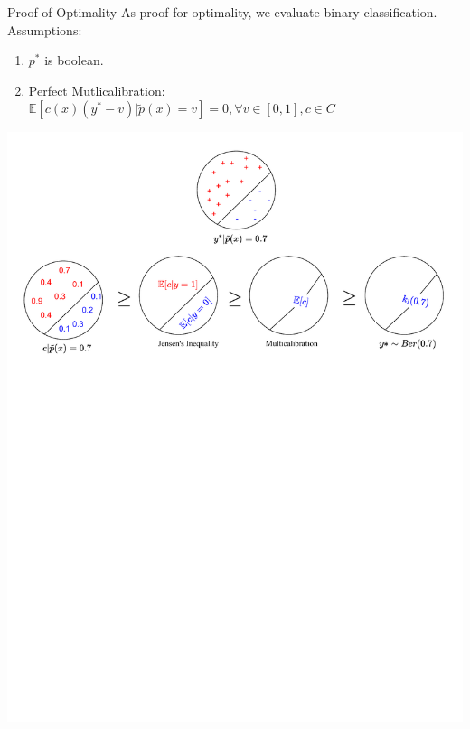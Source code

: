 \documentclass{beamer}
\begin{document}
\begin{frame}{Proof of Optimality}
	As proof for optimality, we evaluate binary classification. Assumptions:
	\begin{enumerate}[label=\arabic*.]
		\item $p^*$ is boolean.
		\item Perfect Mutlicalibration: $\mathbb{E}[c(x)(y^*-v)|\tilde{p}(x)=v]=0,\forall v \in [0, 1], c \in C $
	\end{enumerate} \pause
	\begin{center}
		\includegraphics[width=.97\textwidth]{img/proof}
	\end{center}
\end{frame}
\end{document}
